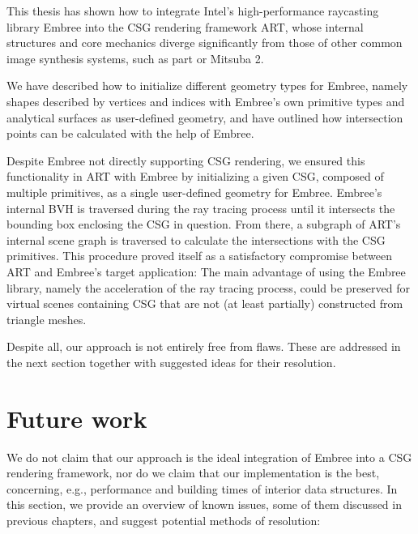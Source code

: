 \label{chap:conclusion}

This thesis has shown how to integrate Intel's high-performance raycasting library Embree into the CSG rendering framework ART, whose internal structures and core mechanics diverge significantly from those of other common image synthesis systems, such as part or Mitsuba 2.

We have described how to initialize different geometry types for Embree, namely shapes described by vertices and indices with Embree's own primitive types and analytical surfaces as user-defined geometry, and have outlined how intersection points can be calculated with the help of Embree. 

Despite Embree not directly supporting CSG rendering, we ensured this functionality in ART with Embree by initializing a given CSG, composed of multiple primitives, as a single user-defined geometry for Embree. Embree's internal BVH is traversed during the ray tracing process until it intersects the bounding box enclosing the CSG in question. From there, a subgraph of ART's internal scene graph is traversed to calculate the intersections with the CSG primitives. This procedure proved itself as a satisfactory compromise between ART and Embree's target application: The main advantage of using the Embree library, namely the acceleration of the ray tracing process, could be preserved for virtual scenes containing CSG that are not (at least partially) constructed from triangle meshes.



Despite all, our approach is not entirely free from flaws. These are addressed in the next section together with suggested ideas for their resolution.  


\section*{Future work}

We do not claim that our approach is the ideal integration of Embree into a CSG rendering framework, nor do we claim that our implementation is the best, concerning, e.g., performance and building times of interior data structures.
In this section, we provide an overview of known issues, some of them discussed in previous chapters, and suggest potential methods of resolution:
\\

